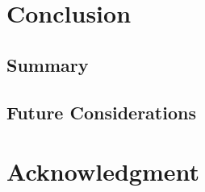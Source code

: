 \documentclass{ieeeojies}
\begin{document}
\section{Conclusion}
\subsection{Summary}

\subsection{Future Considerations}

\section*{Acknowledgment}
\nocite{*}


\EOD
\end{document}
